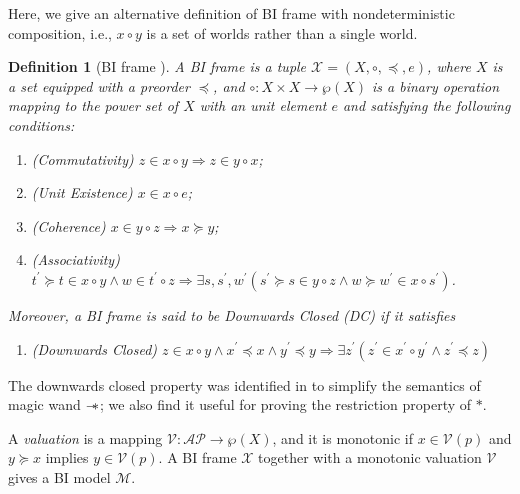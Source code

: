 \documentclass[conference,compsoc, 10pt]{IEEEtran}
\newtheorem{definition}{Definition}[section]
\newcommand {\cM } {{\mathcal{M}}}
\newcommand {\cV } {{\mathcal{V}}}
\newcommand {\cX } {{\mathcal{X}}}
\newcommand {\sepimp} {\mathrel{-\mkern-6mu*}}
\newcommand {\AP} {{\mathcal{AP}}}
\begin{document}
\begin{appendices}
		Here, we give an alternative definition of BI frame with nondeterministic composition, i.e.,  $x\circ y$ is a set of worlds rather than a single world.
		
		\begin{definition}[BI frame \cite{OP99,Doc19}]
			A BI frame is a tuple $\cX = (X,\circ,\preceq,e)$, where $X$ is a set equipped with a preorder $\preceq$, and $\circ: X\times X\rightarrow \wp(X)$ is a binary operation mapping to the power set of $X$ with an unit element $e$ and satisfying the following conditions:
			\begin{enumerate}
				\item (Commutativity) $z\in x\circ y\Rightarrow z\in y\circ x$;
				\item (Unit Existence) $x\in x\circ e$;
				\item (Coherence)  $x\in y\circ z\Rightarrow x\succeq y$;
				\item (Associativity) $t^\prime\succeq t\in x\circ y\wedge w\in t^\prime\circ z\Rightarrow \exists s,s^\prime,w^\prime (s^\prime\succeq s\in y\circ z\wedge w\succeq w^\prime\in x\circ s^\prime)$.
			\end{enumerate}
			Moreover, a BI frame is said to be Downwards Closed (DC) if it satisfies 
			\begin{enumerate}
				\item[(5)] (Downwards Closed) $z\in x\circ y\wedge x^\prime\preceq x\wedge y^\prime\preceq y\Rightarrow \exists z^\prime (z^\prime\in x^\prime\circ y^\prime \wedge z^\prime\preceq z)$
			\end{enumerate}
		\end{definition}
		
		The downwards closed property was identified in \cite{CCA17} to simplify the semantics of magic wand $\sepimp$; we also find it useful for proving the restriction property of $\ast$.
		
		A \emph{valuation} is a mapping $\cV: \AP \rightarrow \wp(X)$, and it is monotonic if $x\in\cV(p)$ and $y \succeq x$ implies $y \in \cV(p)$. A BI frame $\cX$ together with a monotonic valuation $\cV$ gives a BI model $\cM$.
		

\end{appendices}
\end{document}
